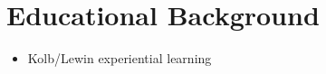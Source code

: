 %
\chapter{Educational Background}
\label{sec:concepts}

\begin{itemize}
    \item Kolb/Lewin experiential learning
\end{itemize}
